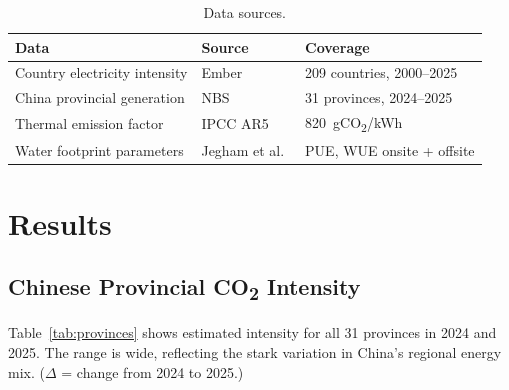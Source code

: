 \documentclass[11pt,a4paper]{article}
\begin{document}
\begin{table}[h]
\centering
\renewcommand{\arraystretch}{1.2}
\begin{tabular}{lll}
\toprule
Data & Source & Coverage \\
\midrule
Country electricity intensity   & Ember~\cite{ember}      & 209 countries, 2000--2025 \\
China provincial generation     & NBS~\cite{nbs}          & 31 provinces, 2024--2025 \\
Thermal emission factor         & IPCC AR5~\cite{ipcc2014}& 820~gCO\textsubscript{2}/kWh \\
Water footprint parameters      & Jegham et al.~\cite{jegham2025} & PUE, WUE onsite + offsite \\
\bottomrule
\end{tabular}
\vspace{4pt}
\caption{Data sources.}
\end{table}

\section{Results}

\subsection{Chinese Provincial CO\textsubscript{2} Intensity}

Table~\ref{tab:provinces} shows estimated intensity for all 31 provinces in
2024 and 2025. The range is wide, reflecting the stark variation in China's
regional energy mix. ($\Delta$ = change from 2024 to 2025.)
\end{document}
